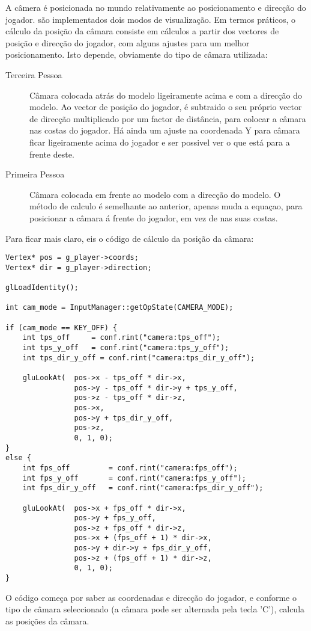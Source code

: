 


A câmera é posicionada no mundo relativamente ao posicionamento e direcção do jogador. são implementados dois modos de visualização.
Em termos práticos, o cálculo da posição da câmara consiste em cálculos a partir dos vectores de posição e direcção do jogador, com alguns ajustes para um melhor posicionamento. Isto depende, obviamente do tipo de câmara utilizada:

\begin{description}
\item[Terceira Pessoa] Câmara colocada atrás do modelo ligeiramente acima e com a direcção do modelo. Ao vector de posição do jogador, é subtraido o seu próprio vector de direcção multiplicado por um factor de distância, para colocar a câmara nas costas do jogador. Há ainda um ajuste na coordenada Y para câmara ficar ligeiramente acima do jogador e ser possivel ver o que está para a frente deste.
\item[Primeira Pessoa] Câmara colocada em frente ao modelo com a direcção do modelo. O método de calculo é semelhante ao anterior, apenas muda a equaçao, para posicionar a câmara á frente do jogador, em vez de nas suas costas.
\end{description}

Para ficar mais claro, eis o código de cálculo da posição da câmara:

\begin{lstlisting}
Vertex* pos = g_player->coords;
Vertex* dir = g_player->direction;

glLoadIdentity();

int cam_mode = InputManager::getOpState(CAMERA_MODE);

if (cam_mode == KEY_OFF) {
	int tps_off		= conf.rint("camera:tps_off");
	int tps_y_off	= conf.rint("camera:tps_y_off");
	int tps_dir_y_off = conf.rint("camera:tps_dir_y_off");
	
	gluLookAt(	pos->x - tps_off * dir->x,
				pos->y - tps_off * dir->y + tps_y_off,
				pos->z - tps_off * dir->z,			
				pos->x,
				pos->y + tps_dir_y_off,
				pos->z,
				0, 1, 0);
}
else {
	int fps_off			= conf.rint("camera:fps_off");
	int fps_y_off		= conf.rint("camera:fps_y_off");
	int fps_dir_y_off	= conf.rint("camera:fps_dir_y_off");

	gluLookAt(	pos->x + fps_off * dir->x,
				pos->y + fps_y_off,
				pos->z + fps_off * dir->z,
				pos->x + (fps_off + 1) * dir->x,
				pos->y + dir->y + fps_dir_y_off,
				pos->z + (fps_off + 1) * dir->z,
				0, 1, 0);
}
\end{lstlisting} 

O código começa por saber as coordenadas e direcção do jogador, e conforme o tipo de câmara seleccionado (a câmara pode ser alternada pela tecla 'C'), calcula as posições da câmara.
